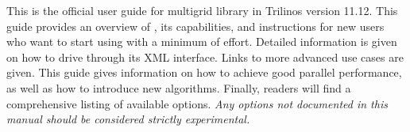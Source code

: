 
This is the official user guide for \muelu{} multigrid library in Trilinos
version 11.12.  This guide provides an overview of \muelu, its capabilities, and
instructions for new users who want to start using \muelu{} with a minimum of
effort. Detailed information is given on how to drive \muelu{} through its XML
interface. Links to more advanced use cases are given. This guide gives
information on how to achieve good parallel performance, as well as how to
introduce new algorithms. Finally, readers will find a comprehensive listing of
available \muelu{} options.  {\em Any options not documented in this manual
should be considered strictly experimental.}
